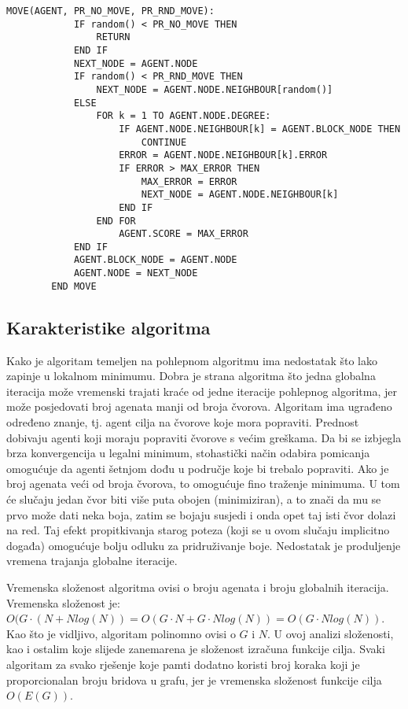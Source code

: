\documentclass[times, utf8, diplomski, numeric]{fer}
\begin{document}
\begin{singlespace}
	\begin{lstlisting}[caption=Detalji funkcije pomaka - MOVE]
		MOVE(AGENT, PR_NO_MOVE, PR_RND_MOVE):
			IF random() < PR_NO_MOVE THEN
				RETURN
			END IF
			NEXT_NODE = AGENT.NODE
			IF random() < PR_RND_MOVE THEN
				NEXT_NODE = AGENT.NODE.NEIGHBOUR[random()]
			ELSE
				FOR k = 1 TO AGENT.NODE.DEGREE:
					IF AGENT.NODE.NEIGHBOUR[k] = AGENT.BLOCK_NODE THEN
						CONTINUE
					ERROR = AGENT.NODE.NEIGHBOUR[k].ERROR
					IF ERROR > MAX_ERROR THEN
						MAX_ERROR = ERROR
						NEXT_NODE = AGENT.NODE.NEIGHBOUR[k]
					END IF
				END FOR
					AGENT.SCORE = MAX_ERROR
			END IF
			AGENT.BLOCK_NODE = AGENT.NODE
			AGENT.NODE = NEXT_NODE
		END MOVE
	\end{lstlisting}
\end{singlespace}

\subsection{Karakteristike algoritma}

Kako je algoritam temeljen na pohlepnom algoritmu ima nedostatak što lako zapinje u lokalnom minimumu. Dobra je strana algoritma što jedna globalna iteracija može vremenski trajati kraće od jedne iteracije pohlepnog algoritma, jer može posjedovati broj agenata manji od broja čvorova. Algoritam ima ugrađeno određeno znanje, tj. agent cilja na čvorove koje mora popraviti. Prednost dobivaju agenti koji moraju popraviti čvorove s većim greškama. Da bi se izbjegla brza konvergencija u legalni minimum, stohastički način odabira pomicanja omogućuje da agenti šetnjom dođu u područje koje bi trebalo popraviti. Ako je broj agenata veći od broja čvorova, to omogućuje fino traženje minimuma. U tom će slučaju jedan čvor biti više puta obojen (minimiziran), a to znači da mu se prvo može dati neka boja, zatim se bojaju susjedi i onda opet taj isti čvor dolazi na red. Taj efekt propitkivanja starog poteza (koji se u ovom slučaju implicitno događa) omogućuje bolju odluku za pridruživanje boje. Nedostatak je produljenje vremena trajanja globalne iteracije.

Vremenska složenost algoritma ovisi o broju agenata i broju globalnih iteracija. Vremenska složenost je: $O(G\cdot(N+Nlog(N))=O(G\cdot N+G\cdot Nlog(N))=O(G\cdot Nlog(N))$. Kao što je vidljivo, algoritam polinomno ovisi o $G$ i $N$. U ovoj analizi složenosti, kao i ostalim koje slijede zanemarena je složenost izračuna funkcije cilja. Svaki algoritam za svako rješenje koje pamti dodatno koristi broj koraka koji je proporcionalan broju bridova u grafu, jer je vremenska složenost funkcije cilja $O(E(G))$. 
\end{document}
